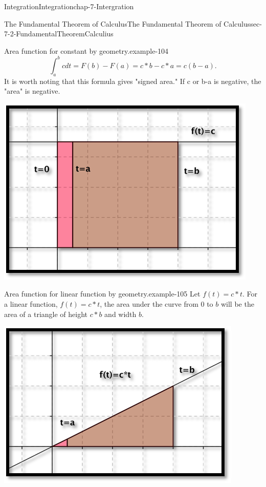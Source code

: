 \documentclass[oneside,10pt,]{book}
\numberwithin{equation}{section}
\begin{document}
\begin{chapterptx}{Integration}{}{Integration}{}{}{chap-7-Intergration}
\begin{sectionptx}{The Fundamental Theorem of Calculus}{}{The Fundamental Theorem of Calculus}{}{}{sec-7-2-FundamentalTheoremCalculius}
\begin{example}{Area function for constant by geometry.}{example-104}
%
\begin{equation*}
\int_a^b c dt=F(b)-F(a)=c*b-c*a=c(b-a).
\end{equation*}
\hypertarget{p-2625}{}%
It is worth noting that this formula gives "signed area."  If c or b-a is negative, the "area" is negative.%
\begin{sidebyside}{1}{0.2}{0.2}{0}%
\begin{sbspanel}{0.6}%
\includegraphics[width=1\linewidth]{images/sec7-2-1.png}
\end{sbspanel}%
\end{sidebyside}%
\end{example}
\begin{example}{Area function for linear function by geometry.}{example-105}%
\hypertarget{p-2626}{}%
Let \(f(t) = c*t\).  For a linear function, \(f(t) = c*t\), the area under the curve from 0 to \(b\) will be the area of a triangle of height \(c*b\) and width \(b\).%
\begin{sidebyside}{1}{0.2}{0.2}{0}%
\begin{sbspanel}{0.6}%
\includegraphics[width=1\linewidth]{images/sec7-2-2.png}

\end{sbspanel}
\end{sidebyside}
\end{example}
\end{sectionptx}
\end{chapterptx}
\end{document}
